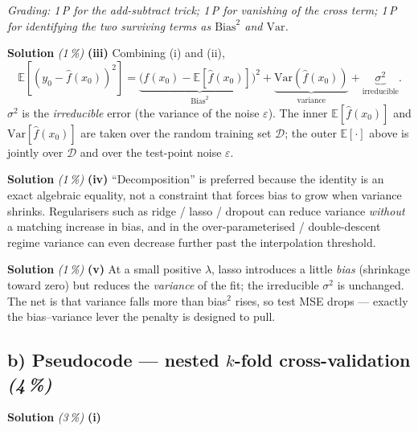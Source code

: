 \documentclass[11pt,a4paper]{article}
\newcommand{\subpoints}[1]{\textit{(#1\,\%)}}
\newcommand{\sol}{\noindent\textbf{Solution}}
\begin{document}
\noindent\emph{Grading: 1\,P for the add-subtract trick; 1\,P for vanishing of the cross term; 1\,P
for identifying the two surviving terms as $\mathrm{Bias}^2$ and $\mathrm{Var}$.}

\medskip
\sol{} \subpoints{1} \textbf{(iii)} Combining (i) and (ii),
$$\mathbb{E}\!\left[(y_0-\hat f(x_0))^2\right]
   = \underbrace{\bigl(f(x_0)-\mathbb{E}[\hat f(x_0)]\bigr)^2}_{\mathrm{Bias}^2}
   + \underbrace{\mathrm{Var}(\hat f(x_0))}_{\text{variance}}
   + \underbrace{\sigma^2}_{\text{irreducible}}.$$
$\sigma^2$ is the \emph{irreducible} error (the variance of the noise $\varepsilon$). The inner
$\mathbb{E}[\hat f(x_0)]$ and $\mathrm{Var}[\hat f(x_0)]$ are taken over the random training set
$\mathcal{D}$; the outer $\mathbb{E}[\cdot]$ above is jointly over $\mathcal{D}$ and over the test-point
noise $\varepsilon$.

\medskip
\sol{} \subpoints{1} \textbf{(iv)} ``Decomposition'' is preferred because the identity is an exact
algebraic equality, not a constraint that forces bias to grow when variance shrinks. Regularisers
such as ridge / lasso / dropout can reduce variance \emph{without} a matching increase in bias,
and in the over-parameterised / double-descent regime variance can even decrease further past the
interpolation threshold.

\medskip
\sol{} \subpoints{1} \textbf{(v)} At a small positive $\lambda$, lasso introduces a little
\emph{bias} (shrinkage toward zero) but reduces the \emph{variance} of the fit; the irreducible
$\sigma^2$ is unchanged. The net is that variance falls more than bias$^2$ rises, so test MSE
drops --- exactly the bias--variance lever the penalty is designed to pull.

\subsection*{b) Pseudocode --- nested $k$-fold cross-validation \subpoints{4}}

\sol{} \subpoints{3} \textbf{(i)}
\end{document}
